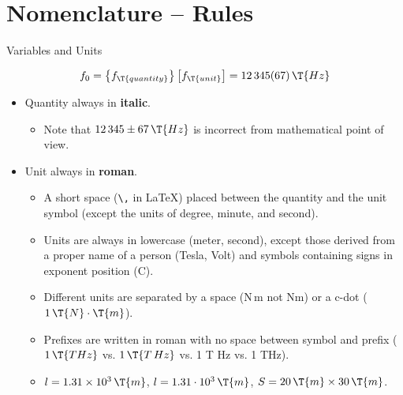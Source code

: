 \documentclass[xcolor=dvipsnames, aspectratio=169, handout, intlimits]{beamer}
\begin{document}
\section{Nomenclature -- Rules}
\begin{frame}{Variables and Units}

\vspace{-0.5cm}
\begin{equation*}
f_0 = \left\{f_\T{quantity} \right\} \left[f_\T{unit} \right] = 12\,345(67)\,\T{Hz}
\end{equation*}

\vspace{-0.25cm}
\begin{itemize}
	\item<2-> Quantity always in \textbf{italic}.
	\begin{itemize}
		\item<3-> Note that $12\,345 \pm 67\,\T{Hz}$ is incorrect from mathematical point of view.
	\end{itemize}
	\item<4-> Unit always in \textbf{roman}.
	\begin{itemize}
		\item<5-> A short space (\texttt{\textbackslash ,} in \LaTeX) placed between the quantity and the unit symbol (except the units of degree, minute, and second).
		\item<6-> Units are always in lowercase (meter, second), except those derived from a proper name of a person (Tesla, Volt) and symbols containing signs in exponent position (\degree C).
		\item<7-> Different units are separated by a space (N\,m not Nm) or a c-dot ($1\,\T{N}\cdot\T{m}$).
		\item<8-> Prefixes are written in roman with no space between symbol and prefix ($1\,\T{THz}$ vs. $1\,\T{T\,Hz}$ vs. 1 T Hz vs. 1 THz).
		\item<9-> $l = 1.31 \times 10^3\,\T{m}$, $l = 1.31 \cdot 10^3\,\T{m}$, $S = 20\,\T{m} \times 30\,\T{m}$.
	\end{itemize}
\end{itemize}

\end{frame}
\end{document}
